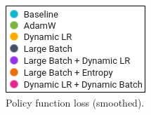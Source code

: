\documentclass[10pt,conference]{IEEEtran}
\begin{document}
\begin{figure}[htbp]
  \centering
  \begin{minipage}[b]{\textwidth}
    \centering
  \end{minipage}
  \hfill
  \begin{minipage}[b]{\textwidth}
    \centering
    \includegraphics{figs/legend.png}
    \caption{Policy function loss (smoothed).}
    \label{fig:policy_loss}
  \end{minipage}
\end{figure}



\end{document}
